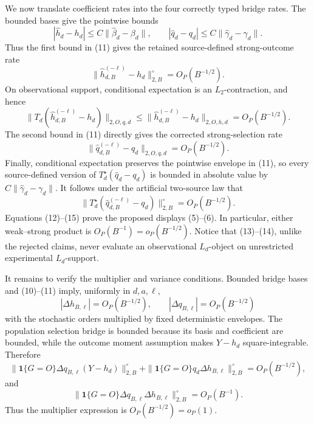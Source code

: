 We now translate coefficient rates into the four correctly typed bridge rates.  The bounded bases give the pointwise bounds
\[
 |\widehat h_d-h_d|\le C\|\widehat\beta_d-\beta_d\|,
 \qquad
 |\widehat q_d-q_d|\le C\|\widehat\gamma_d-\gamma_d\|.       \tag{11}
\]
Thus the first bound in (11) gives the retained source-defined strong-outcome rate
\[
 \|\widehat h_{d,B}^{(-\ell)}-h_d\|_{2,B}^{\circ}
 =O_P(B^{-1/2}).                                               \tag{12}
\]
On observational support, conditional expectation is an \(L_2\)-contraction, and hence
\[
 \|T_d(\widehat h_{d,B}^{(-\ell)}-h_d)\|_{2,O,q,d}
 \le \|\widehat h_{d,B}^{(-\ell)}-h_d\|_{2,O,h,d}
 =O_P(B^{-1/2}).                                               \tag{13}
\]
The second bound in (11) directly gives the corrected strong-selection rate
\[
 \|\widehat q_{d,B}^{(-\ell)}-q_d\|_{2,O,q,d}
 =O_P(B^{-1/2}).                                               \tag{14}
\]
Finally, conditional expectation preserves the pointwise envelope in (11), so every source-defined version of \(T_d^\star(\widehat q_d-q_d)\) is bounded in absolute value by \(C\|\widehat\gamma_d-\gamma_d\|\).  It follows under the artificial two-source law that
\[
 \|T_d^\star(\widehat q_{d,B}^{(-\ell)}-q_d)\|_{2,B}^{\circ}
 =O_P(B^{-1/2}).                                               \tag{15}
\]
Equations (12)--(15) prove the proposed displays (5)--(6).  In particular, either weak--strong product is \(O_P(B^{-1})=o_P(B^{-1/2})\).  Notice that (13)--(14), unlike the rejected claims, never evaluate an observational \(L_d\)-object on unrestricted experimental \(L_d\)-support.

It remains to verify the multiplier and variance conditions.  Bounded bridge bases and (10)--(11) imply, uniformly in \(d,a,\ell\),
\[
 |\Delta h_{B,\ell}|=O_P(B^{-1/2}),
 \qquad
 |\Delta q_{B,\ell}|=O_P(B^{-1/2})                            \tag{16}
\]
with the stochastic orders multiplied by fixed deterministic envelopes.  The population selection bridge is bounded because its basis and coefficient are bounded, while the outcome moment assumption makes \(Y-h_d\) square-integrable.  Therefore
\[
 \|\mathbf1\{G=O\}\Delta q_{B,\ell}(Y-h_d)\|_{2,B}^{\circ}
 +\|\mathbf1\{G=O\}q_d\Delta h_{B,\ell}\|_{2,B}^{\circ}
 =O_P(B^{-1/2}),                                               \tag{17}
\]
and
\[
 \|\mathbf1\{G=O\}\Delta q_{B,\ell}\Delta h_{B,\ell}\|_{2,B}^{\circ}
 =O_P(B^{-1}).                                                 \tag{18}
\]
Thus the multiplier expression is \(O_P(B^{-1/2})=o_P(1)\).

